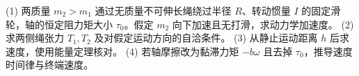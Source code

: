 (1) 两质量 \(m_2>m_1\) 通过无质量不可伸长绳绕过半径 \(R\)、转动惯量 \(I\) 的固定滑轮，轴的恒定阻力矩大小 \(\tau_0\)。假定 \(m_2\) 向下加速且无打滑，求动力学加速度。
(2) 求两侧绳张力 \(T_1,T_2\) 及对假定运动方向的自洽条件。
(3) 从静止运动距离 \(h\) 后求速度，使用能量定理核对。
(4) 若轴摩擦改为黏滞力矩 \(-b\omega\) 且去掉 \(\tau_0\)，推导速度时间律与终端速度。
